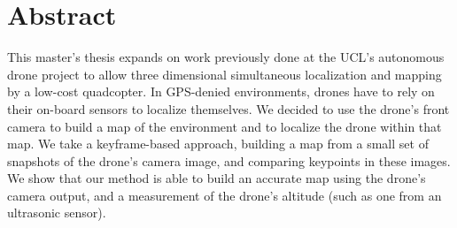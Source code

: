 \chapter*{Abstract}
This master's thesis expands on work previously done at the UCL's autonomous drone project to allow three dimensional simultaneous localization and mapping by a low-cost quadcopter. In GPS-denied environments, drones have to rely on their on-board sensors to localize themselves. We decided to use the drone's front camera to build a map of the environment and to localize the drone within that map. We take a keyframe-based approach, building a map from a small set of snapshots of the drone's camera image, and comparing keypoints in these images. We show that our method is able to build an accurate map using the drone's camera output, and a measurement of the drone's altitude (such as one from an ultrasonic sensor).